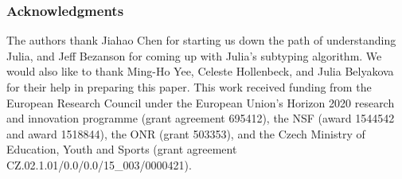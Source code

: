 \documentclass[a4paper,english]{lipics-v2019}
\begin{document}
\subsubsection*{Acknowledgments} The authors thank Jiahao Chen for starting us
down the path of understanding Julia, and Jeff Bezanson for coming up with
Julia's subtyping algorithm. We would  also like to thank Ming-Ho Yee, Celeste
Hollenbeck, and Julia Belyakova for their help in preparing this paper. This
work received funding from the European Research Council under the European
Union's Horizon 2020 research and innovation programme (grant agreement
695412), the NSF (award 1544542 and award 1518844), the ONR (grant 503353),
and the Czech Ministry of Education, Youth and Sports (grant agreement
CZ.02.1.01/0.0/0.0/15\_003/0000421).
 

%

\end{document}
